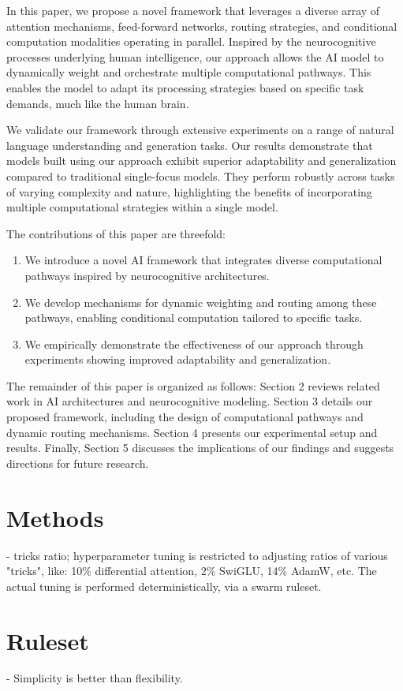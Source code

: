 \documentclass{article}
\begin{document}
In this paper, we propose a novel framework that leverages a diverse array of attention mechanisms, feed-forward networks, routing strategies, and conditional computation modalities operating in parallel. Inspired by the neurocognitive processes underlying human intelligence, our approach allows the AI model to dynamically weight and orchestrate multiple computational pathways. This enables the model to adapt its processing strategies based on specific task demands, much like the human brain.

We validate our framework through extensive experiments on a range of natural language understanding and generation tasks. Our results demonstrate that models built using our approach exhibit superior adaptability and generalization compared to traditional single-focus models. They perform robustly across tasks of varying complexity and nature, highlighting the benefits of incorporating multiple computational strategies within a single model.

The contributions of this paper are threefold:

\begin{enumerate} \item We introduce a novel AI framework that integrates diverse computational pathways inspired by neurocognitive architectures. \item We develop mechanisms for dynamic weighting and routing among these pathways, enabling conditional computation tailored to specific tasks. \item We empirically demonstrate the effectiveness of our approach through experiments showing improved adaptability and generalization. \end{enumerate}

The remainder of this paper is organized as follows: Section 2 reviews related work in AI architectures and neurocognitive modeling. Section 3 details our proposed framework, including the design of computational pathways and dynamic routing mechanisms. Section 4 presents our experimental setup and results. Finally, Section 5 discusses the implications of our findings and suggests directions for future research.

\section{Methods}

- tricks ratio; hyperparameter tuning is restricted to adjusting ratios of various "tricks", like: 10\% differential attention, 2\% SwiGLU, 14\% AdamW, etc. The actual tuning is performed deterministically, via a swarm ruleset.

\section{Ruleset}

- Simplicity is better than flexibility.



\end{document}
